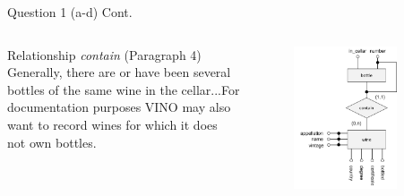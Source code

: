 \begin{frame}[fragile]{Question 1 (a-d) Cont.}
\begin{columns}
	\begin{exampleblock}{Relationship \textit{contain} (Paragraph 4)}
		Generally, there are or have been several bottles of the same wine in the cellar...For documentation purposes VINO may also want to record wines for which it does not own bottles.
	\end{exampleblock}
	\begin{figure}
		\includegraphics[width=0.8\textwidth, trim=1.1cm 0 0 0, clip]{t4/images/contain_relationship.png}
	\end{figure}
\end{columns}
\end{frame}

